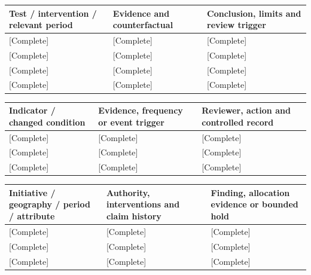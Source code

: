 {\sffamily\fontsize{8.3}{10.3}\selectfont\begin{longtable}{@{}P{52.79mm} P{59.39mm} P{52.79mm}@{}}
\toprule
\textbf{Test / intervention / relevant period} & \textbf{Evidence and counterfactual} & \textbf{Conclusion, limits and review trigger}\\\midrule\endhead
\rule{0pt}{7.7mm}[Complete] & [Complete] & [Complete]\\\hline
\rule{0pt}{7.7mm}[Complete] & [Complete] & [Complete]\\\hline
\rule{0pt}{7.7mm}[Complete] & [Complete] & [Complete]\\\hline
\rule{0pt}{7.7mm}[Complete] & [Complete] & [Complete]\\\hline
\end{longtable}}
{\sffamily\fontsize{8.3}{10.3}\selectfont\begin{longtable}{@{}P{52.79mm} P{57.74mm} P{54.44mm}@{}}
\toprule
\textbf{Indicator / changed condition} & \textbf{Evidence, frequency or event trigger} & \textbf{Reviewer, action and controlled record}\\\midrule\endhead
\rule{0pt}{7.7mm}[Complete] & [Complete] & [Complete]\\\hline
\rule{0pt}{7.7mm}[Complete] & [Complete] & [Complete]\\\hline
\rule{0pt}{7.7mm}[Complete] & [Complete] & [Complete]\\\hline
\end{longtable}}
{\sffamily\fontsize{8.3}{10.3}\selectfont\begin{longtable}{@{}P{56.09mm} P{56.09mm} P{52.79mm}@{}}
\toprule
\textbf{Initiative / geography / period / attribute} & \textbf{Authority, interventions and claim history} & \textbf{Finding, allocation evidence or bounded hold}\\\midrule\endhead
\rule{0pt}{7.7mm}[Complete] & [Complete] & [Complete]\\\hline
\rule{0pt}{7.7mm}[Complete] & [Complete] & [Complete]\\\hline
\rule{0pt}{7.7mm}[Complete] & [Complete] & [Complete]\\\hline
\end{longtable}}
